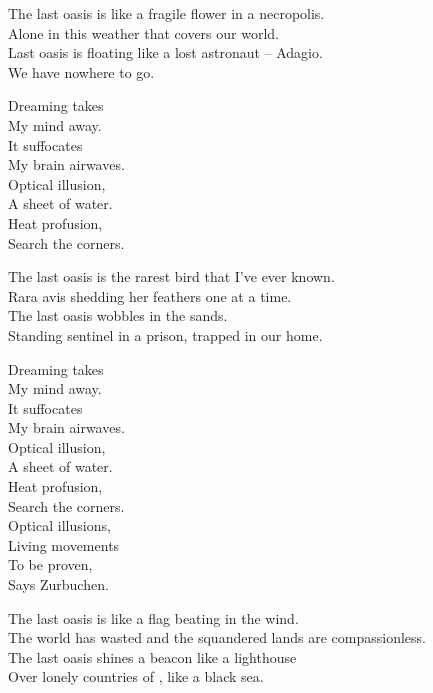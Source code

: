 
The last oasis is like a fragile flower in a necropolis. \\
Alone in this weather that covers our world. \\
Last oasis is floating like a lost astronaut -- Adagio. \\
We have nowhere to go. \\


Dreaming takes \\
My mind away. \\
It suffocates \\
My brain airwaves. \\

Optical illusion, \\
A sheet of water. \\
Heat profusion, \\
Search the corners. \\


The last oasis is the rarest bird that I've ever known. \\
Rara avis shedding her feathers one at a time. \\
The last oasis wobbles in the  sands. \\
Standing sentinel in a prison, trapped in our home. \\


Dreaming takes \\
My mind away. \\
It suffocates \\
My brain airwaves. \\

Optical illusion, \\
A sheet of water. \\
Heat profusion, \\
Search the corners. \\

Optical illusions, \\
Living movements \\
To be proven, \\
Says Zurbuchen. \\


The last oasis is like a flag beating in the wind. \\
The world has wasted and the squandered lands are compassionless. \\
The last oasis shines a beacon like a lighthouse \\
Over lonely countries of , like a black sea. \\

